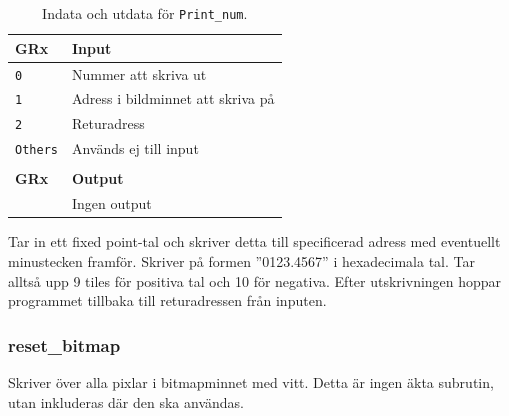 \documentclass[]{article}
\begin{document}
\begin{table}[H]
\centering
\begin{tabular}{ll}
	\textbf{GRx}    & \textbf{Input}                    \\ \hline
	\texttt{0}      & Nummer att skriva ut              \\
	\texttt{1}      & Adress i bildminnet att skriva på \\
	\texttt{2}      & Returadress                       \\
	\texttt{Others} & Används ej till input             \\
	                &  \\
	\textbf{GRx}    & \textbf{Output}                   \\ \hline
	                & Ingen output 			    \\
\end{tabular}
\caption{Indata och utdata för \texttt{Print\_num}.}
\end{table}


\noindent
Tar in ett fixed point-tal och skriver detta till specificerad adress med eventuellt minustecken framför. Skriver på formen ''0123.4567'' i hexadecimala tal. Tar alltså upp 9 tiles för positiva tal och 10 för negativa. Efter utskrivningen hoppar programmet tillbaka till returadressen från inputen.

\subsubsection{reset\_bitmap}
Skriver över alla pixlar i bitmapminnet med vitt. Detta är ingen äkta subrutin, utan inkluderas där den ska användas.



\clearpage
\end{document}
